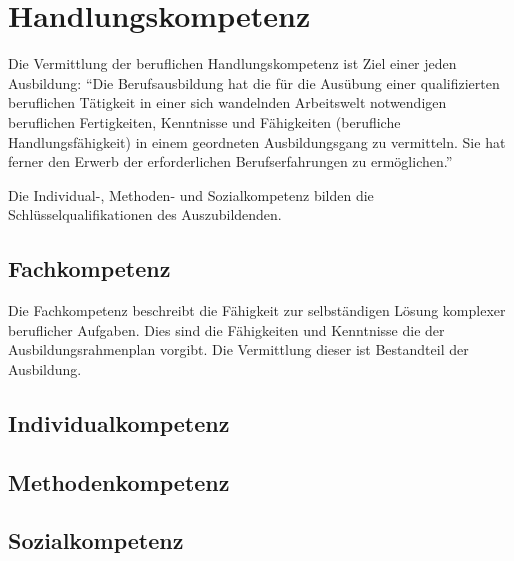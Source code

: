 \chapter{Handlungskompetenz}
Die Vermittlung der beruflichen Handlungskompetenz ist Ziel einer jeden Ausbildung: \enquote{Die Berufsausbildung hat die für die Ausübung einer qualifizierten beruflichen Tätigkeit in einer sich wandelnden Arbeitswelt notwendigen beruflichen Fertigkeiten, Kenntnisse und Fähigkeiten (berufliche Handlungsfähigkeit) in einem geordneten Ausbildungsgang zu vermitteln. Sie hat ferner den Erwerb der erforderlichen Berufserfahrungen zu ermöglichen.}\autocite[][§1\,III BBiG]{berufsbildungsgesetz_bbig_bbig_nodate} 
\par
Die Individual-, Methoden- und Sozialkompetenz bilden die Schlüsselqualifikationen des Auszubildenden. 

\section{Fachkompetenz}
Die Fachkompetenz beschreibt die Fähigkeit zur selbständigen Lösung komplexer beruflicher Aufgaben. Dies sind die Fähigkeiten und Kenntnisse die der Ausbildungsrahmenplan vorgibt. Die Vermittlung dieser ist Bestandteil der Ausbildung. 
\par

\section{Individualkompetenz}

\section{Methodenkompetenz}

\section{Sozialkompetenz}
